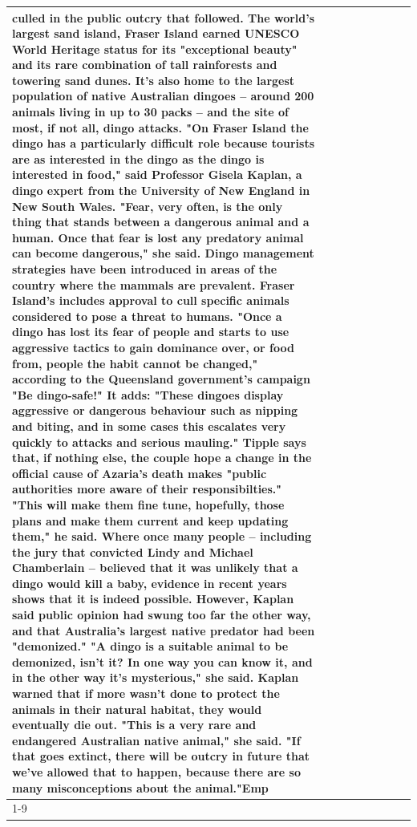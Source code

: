 \begin{table}[H]
\begin{tabular}{lllrlllll}
culled in the public outcry that followed. The world's largest sand island, Fraser Island earned UNESCO World Heritage status for its "exceptional beauty" and its rare combination of tall rainforests and towering sand dunes. It's also home to the largest population of native Australian dingoes -- around 200 animals living in up to 30 packs -- and the site of most, if not all, dingo attacks. "On Fraser Island the dingo has a particularly difficult role because tourists are as interested in the dingo as the dingo is interested in food," said Professor Gisela Kaplan, a dingo expert from the University of New England in New South Wales. "Fear, very often, is the only thing that stands between a dangerous animal and a human. Once that fear is lost any predatory animal can become dangerous," she said. Dingo management strategies have been introduced in areas of the country where the mammals are prevalent. Fraser Island's includes approval to cull specific animals considered to pose a threat to humans. "Once a dingo has lost its fear of people and starts to use aggressive tactics to gain dominance over, or food from, people the habit cannot be changed," according to the Queensland government's campaign "Be dingo-safe!" It adds: "These dingoes display aggressive or dangerous behaviour such as nipping and biting, and in some cases this escalates very quickly to attacks and serious mauling." Tipple says that, if nothing else, the couple hope a change in the official cause of Azaria's death makes "public authorities more aware of their responsibilties." "This will make them fine tune, hopefully, those plans and make them current and keep updating them," he said. Where once many people -- including the jury that convicted Lindy and Michael Chamberlain -- believed that it was unlikely that a dingo would kill a baby, evidence in recent years shows that it is indeed possible. However, Kaplan said public opinion had swung too far the other way, and that Australia's largest native predator had been "demonized." "A dingo is a suitable animal to be demonized, isn't it? In one way you can know it, and in the other way it's mysterious," she said. Kaplan warned that if more wasn't done to protect the animals in their natural habitat, they would eventually die out. "This is a very rare and endangered Australian native animal," she said. "If that goes extinct, there will be outcry in future that we've allowed that to happen, because there are so many misconceptions about the animal."Emp \\
\cline{1-9}

\end{tabular}
\end{table}
